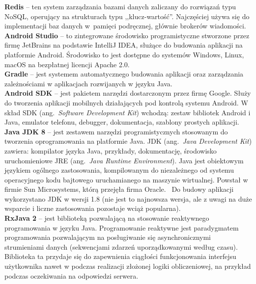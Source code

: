 \noindent\textbf{Redis} -- ten system zarządzania bazami danych zaliczany do rozwiązań typu NoSQL, operujący na strukturach typu ,,klucz-wartość''. 
Najczęściej używa się do implementacji baz danych w~pamięci podręcznej, głównie brokerów wiadomości.~\cite{redis} \\

\noindent\textbf{Android Studio} -- to zintegrowane środowisko programistyczne stworzone przez firmę JetBrains na podstawie IntelliJ IDEA, służące do budowania aplikacji na platformie Android. Środowisko to jest dostępne do systemów Windows, Linux, macOS na bezpłatnej licencji Apache 2.0.~\cite{android_doc,android_studio} \\

\noindent\textbf{Gradle} -- jest systemem automatycznego budowania aplikacji oraz zarządzania zależnościami w aplikacjach rozwijanych w języku Java.~\cite{gradle,gradle_android_doc} \\

\noindent\textbf{Android SDK} -- jest pakietem narzędzi dostarczonym przez firmę Google. Służy do tworzenia aplikacji mobilnych działających pod kontrolą systemu Android. W skład SDK (ang.~\emph{Software Development Kit}) wchodzą: zestaw bibliotek Android i Java, emulator telefonu, debugger, dokumentacja, szablony prostych aplikacji.~\cite{android_studio} \\

\noindent\textbf{Java JDK 8} -- jest zestawem narzędzi programistycznych stosowanym do tworzenia oprogramowania na platformie Java. JDK (ang.~\emph{Java Development Kit}) zawiera: kompilator języka Java, przykłady, dokumentację, środowisko uruchomieniowe JRE (ang.~\emph{Java Runtime Environment}).
Java jest obiektowym językiem ogólnego zastosowania, kompilowanym do niezależnego od systemu operacyjnego kodu bajtowego uruchamianego na maszynie wirtualnej. Powstał w firmie Sun Microsystems, którą przejęła firma Oracle.~\cite{java_doc} 
Do budowy aplikacji wykorzystano JDK w wersji 1.8 (nie jest to najnowsza wersja, ale z uwagi na duże wsparcie i liczne zastosowania pozostaje wciąż popularna). \\

\noindent\textbf{RxJava 2} -- jest biblioteką pozwalającą na stosowanie reaktywnego programowania w języku Java. Programowanie reaktywne jest paradygmatem programowania pozwalającym na posługiwanie się asynchronicznymi strumieniami danych (sekwencjami zdarzeń uporządkowanymi według czasu).
Biblioteka ta przydaje się do zapewnienia ciągłości funkcjonowania interfejsu użytkownika nawet w podczas realizacji złożonej logiki obliczeniowej, na przykład podczas oczekiwania na odpowiedzi serwera. \\

